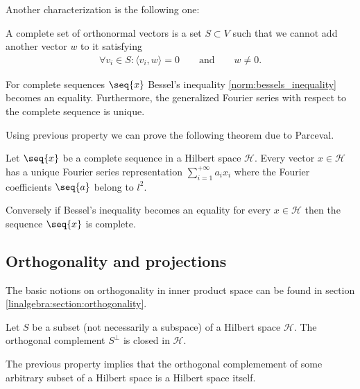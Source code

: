     Another characterization is the following one:
    \begin{adefinition}
        A complete set of orthonormal vectors is a set $S\subset V$ such that we cannot add another vector $w$ to it satisfying
        \begin{gather}
            \forall v_i\in S: \langle v_i, w\rangle = 0\qquad\text{and}\qquad  w\neq0.
        \end{gather}
    \end{adefinition}

    \begin{property}
        For complete sequences $\seq{x}$ Bessel's inequality \ref{norm:bessels_inequality} becomes an equality. Furthermore, the generalized Fourier series with respect to the complete sequence is unique.
    \end{property}

    Using previous property we can prove the following theorem due to Parceval.
    \begin{theorem}[Parceval]
        Let $\seq{x}$ be a complete sequence in a Hilbert space $\mathcal{H}$. Every vector $x\in\mathcal{H}$ has a unique Fourier series representation $\sum_{i=1}^{+\infty}a_ix_i$ where the Fourier coefficients $\seq{a}$ belong to $l^2$.

        Conversely if Bessel's inequality becomes an equality for every $x\in\mathcal{H}$ then the sequence $\seq{x}$ is complete.
    \end{theorem}

\subsection{Orthogonality and projections}

    The basic notions on orthogonality in inner product space can be found in section \ref{linalgebra:section:orthogonality}.

    \begin{property}
        Let $S$ be a subset (not necessarily a subspace) of a Hilbert space $\mathcal{H}$. The orthogonal complement $S^\perp$ is closed in $\mathcal{H}$.
    \end{property}
    \begin{result}
        The previous property implies that the orthogonal complemement of some arbitrary subset of a Hilbert space is a Hilbert space itself.
    \end{result}

